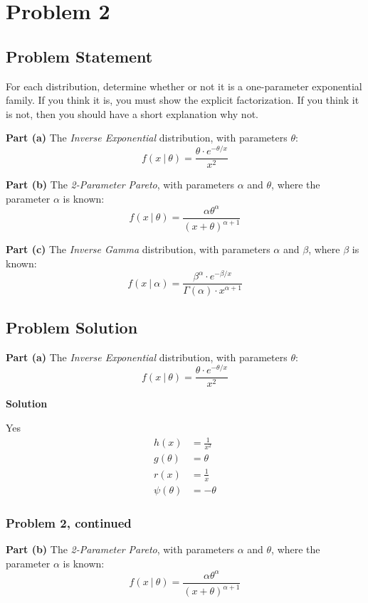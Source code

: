 \documentclass[12pt]{article}
\theoremstyle{definition}
\begin{document}
\newpage
\section*{Problem 2}

\subsection*{Problem Statement}

For each distribution, determine whether or not it is a one-parameter exponential family. If you think it is, you must show the explicit factorization. If you think it is not, then you should have a short explanation why not. 

\bigskip
\noindent
{\bf Part (a)} The {\em Inverse Exponential} distribution, with parameters $\theta$:
$$
f(x\ |\ \theta) = \frac{ \theta \cdot e^{-\theta/x} }{x^2 }
$$

\bigskip
\noindent
{\bf Part (b)} The {\em 2-Parameter Pareto}, with parameters $\alpha$ and $\theta$, where the parameter $\alpha$ is known:
$$
f(x\ |\ \theta) = \frac{ \alpha \theta^\alpha }{ (x + \theta)^{\alpha + 1}}
$$

\bigskip
\noindent
{\bf Part (c)} The {\em Inverse Gamma} distribution, with parameters $\alpha$ and $\beta$, where $\beta$ is known:
$$
f(x\ |\ \alpha) = \frac{ \beta^\alpha \cdot e^{-\beta/x} }{\Gamma(\alpha) \cdot x^{\alpha + 1} }
$$


\subsection*{Problem Solution}
\noindent
{\bf Part (a)} The {\em Inverse Exponential} distribution, with parameters $\theta$:
$$
f(x\ |\ \theta) = \frac{ \theta \cdot e^{-\theta/x} }{x^2 }
$$

\bigskip
\noindent
{\bf Solution}

Yes
\begin{align*}
h(x) &= \frac{1}{x^2}\\
g(\theta) &= \theta\\
r(x) &= \frac{1}{x}\\
\psi(\theta) &= -\theta
\end{align*}
\newpage
\subsubsection*{Problem 2, continued}

\noindent
{\bf Part (b)} The {\em 2-Parameter Pareto}, with parameters $\alpha$ and $\theta$, where the parameter $\alpha$ is known:
$$
f(x\ |\ \theta) = \frac{ \alpha \theta^\alpha }{ (x + \theta)^{\alpha + 1}}
$$
\end{document}
